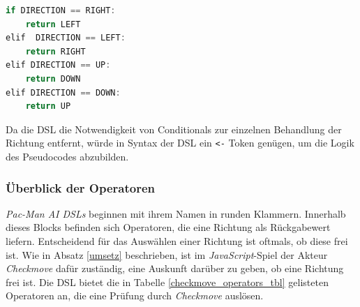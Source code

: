 \documentclass[conference]{IEEEtran}
\begin{document}
\begin{lstlisting}[language=Java, captionpos=b, caption=Umkehren der Richtung in Pseudocode, label=direction_pseudo]
if DIRECTION == RIGHT:
    return LEFT
elif  DIRECTION == LEFT:
    return RIGHT
elif DIRECTION == UP:
    return DOWN
elif DIRECTION == DOWN:
    return UP
\end{lstlisting}

Da die DSL die Notwendigkeit von Conditionals zur einzelnen Behandlung der Richtung entfernt, würde in Syntax der DSL ein \texttt{<-} Token genügen, um  die Logik des Pseudocodes abzubilden.
\subsubsection{Überblick der Operatoren}
\emph{Pac-Man AI DSLs} beginnen mit ihrem Namen in runden Klammern. Innerhalb dieses Blocks befinden sich Operatoren, die eine Richtung als Rückgabewert liefern. Entscheidend für das Auswählen einer Richtung ist oftmals, ob diese frei ist. Wie in Absatz \ref{umsetz} beschrieben, ist im \emph{JavaScript}-Spiel der Akteur \emph{Checkmove} dafür zuständig, eine Auskunft darüber zu geben, ob eine Richtung frei ist. Die DSL bietet die in Tabelle \ref{checkmove_operators_tbl} gelisteten Operatoren an, die eine Prüfung durch \emph{Checkmove} auslösen.

\lstset{
  breaklines=true
  }
\end{document}
